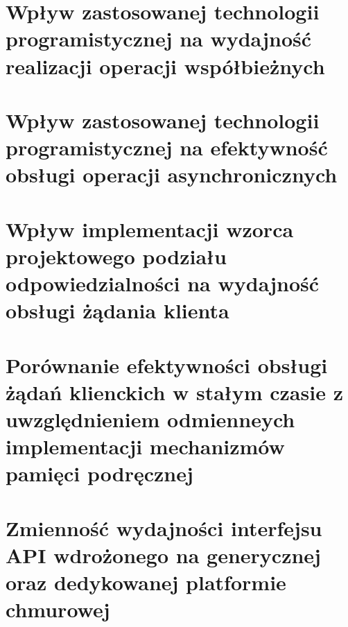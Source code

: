
\section{Wpływ zastosowanej technologii programistycznej na wydajność realizacji operacji współbieżnych}
\section{Wpływ zastosowanej technologii programistycznej na efektywność obsługi operacji asynchronicznych}
\section{Wpływ implementacji wzorca projektowego podziału odpowiedzialności na wydajność obsługi żądania klienta}
\label{sec:cqrs-and-database-improvements}
\section{Porównanie efektywności obsługi żądań klienckich w stałym czasie z uwzględnieniem odmienneych implementacji mechanizmów pamięci podręcznej}
\section{Zmienność wydajności interfejsu API wdrożonego na generycznej oraz dedykowanej platformie chmurowej}